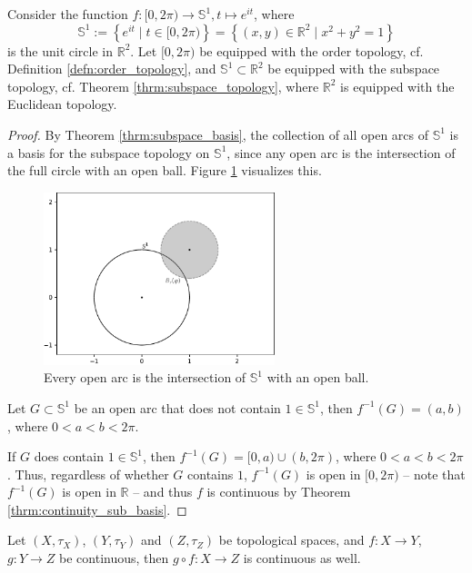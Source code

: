 \begin{exmp}
	Consider the function $f: [0, 2\pi)\to \mathbb S^1, t\mapsto e^{it}$, where $$\mathbb S^1 := \left\{e^{it} \mid t\in [0, 2\pi)\right\} = \left\{(x, y)\in\mathbb R^2 \mid x^2 + y^2  = 1\right\}$$ is the unit circle in $\mathbb R^2$. Let $[0, 2\pi)$ be equipped with the order topology, cf. Definition \ref{defn:order_topology}, and $\mathbb S^1\subset\mathbb R^2$ be equipped with the subspace topology, cf. Theorem \ref{thrm:subspace_topology}, where $\mathbb R^2$ is equipped with the Euclidean topology.
\end{exmp}

\begin{proof}
	By Theorem \ref{thrm:subspace_basis}, the collection of all open arcs of $\mathbb S^1$ is a basis for the subspace topology on $\mathbb S^1$, since any open arc is the intersection of the full circle with an open ball. Figure \ref{fig:open_arc} visualizes this.
	\begin{figure}[h]
		\centering
		\includegraphics[width=0.6\textwidth]{Figures/circles_intersection_arc.pdf}
		\caption{Every open arc is the intersection of $\mathbb S^1$ with an open ball.}
		\label{fig:open_arc}
	\end{figure}
	
	Let $G\subset \mathbb S^1$ be an open arc that does not contain $1\in \mathbb S^1$, then $f^{-1}(G) = (a, b)$, where $0 < a < b < 2\pi$. 
	
	If $G$ does contain $1\in\mathbb S^1$, then $f^{-1}(G) = [0, a) \cup (b, 2\pi)$, where $0 < a < b < 2\pi$. Thus, regardless of whether $G$ contains $1$, $f^{-1}(G)$ is open in $[0, 2\pi)$ -- note that $f^{-1}(G)$ is open in $\mathbb R$ -- and thus $f$ is continuous by Theorem \ref{thrm:continuity_sub_basis}.
\end{proof}

\begin{theorem}\label{thrm:composition_continuous_functions}
	Let $(X, \tau_X)$, $(Y, \tau_Y)$ and $(Z, \tau_Z)$ be topological spaces, and $f: X\to Y$, $g: Y\to Z$ be continuous, then $g\circ f: X\to Z$ is continuous as well.
\end{theorem}

